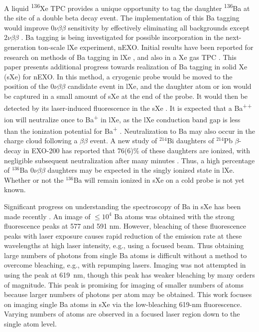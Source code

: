 \documentclass[aps,pra,reprint,superscriptaddress]{revtex4-1}
\begin{document}
A liquid \textsuperscript{136}Xe TPC provides a unique opportunity to tag the daughter \textsuperscript{136}Ba at the site of a double beta decay event. The implementation of this Ba tagging would improve $0\nu\beta\beta$ sensitivity by effectively eliminating all backgrounds except $2\nu\beta\beta$ \cite{Moe1991}.  Ba tagging is being investigated for possible incorporation in the next-generation ton-scale lXe experiment, nEXO.  Initial results have been reported for research on methods of Ba tagging in lXe \cite{Mong2015,Twelker2014}, and also in a Xe gas TPC \cite{Brunner2015}.  This paper presents additional progress towards realization of Ba tagging in solid Xe (sXe) for nEXO.  In this method, a cryogenic probe would be moved to the position of the $0\nu\beta\beta$ candidate event in lXe, and the daughter atom or ion would be captured in a small amount of sXe at the end of the probe.  It would then be detected by its laser-induced fluorescence in the sXe \cite{Mong2015}.  It is expected that a Ba\textsuperscript{++} ion will neutralize once to Ba\textsuperscript{+} in lXe, as the lXe conduction band gap is less than the ionization potential for Ba\textsuperscript{+} \cite{Moe1991}.  Neutralization to Ba may also occur in the charge cloud following a $\beta\beta$ event.  A new study of $^{214}$Bi daughters of $^{214}$Pb $\beta$-decay in EXO-200 has reported that 76(6)\% of these daughters are ionized, with negligible subsequent neutralization after many minutes \cite{alphaion}.  Thus, a high percentage of $^{136}$Ba $0\nu\beta\beta$ daughters may be expected in the singly ionized state in lXe.  Whether or not the $^{136}$Ba will remain ionized in sXe on a cold probe is not yet known.

Significant progress on understanding the spectroscopy of Ba in sXe has been made recently \cite{Mong2015,McCaffrey2016}.  An image of $\leq 10^4$ Ba atoms was obtained with the strong fluorescence peaks at 577 and 591 nm.  However, bleaching of these fluorescence peaks with laser exposure causes rapid reduction of the emission rate at these wavelengths at high laser intensity, e.g., using a focused beam.  Thus obtaining large numbers of photons from single Ba atoms is difficult without a method to overcome bleaching, e.g., with repumping lasers.  Imaging was not attempted in \cite{Mong2015} using the peak at 619~nm, though this peak has weaker bleaching by many orders of magnitude.  This peak is promising for imaging of smaller numbers of atoms because larger numbers of photons per atom may be obtained.  This work focuses on imaging single Ba atoms in sXe via the low-bleaching 619-nm fluorescence.  Varying numbers of atoms are observed in a focused laser region down to the single atom level.
\end{document}
